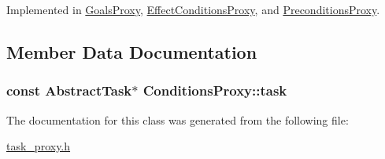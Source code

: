 Implemented in \hyperlink{classGoalsProxy_abfc758e237e5ef8d56fd1e0c0f3eb6f8}{Goals\-Proxy}, \hyperlink{classEffectConditionsProxy_af447849d62079e622be08a68df7dab14}{Effect\-Conditions\-Proxy}, and \hyperlink{classPreconditionsProxy_a63cac56561ada0b576cff8f732a3a902}{Preconditions\-Proxy}.



\subsection{Member Data Documentation}
\hypertarget{classConditionsProxy_a8e8c904bd5dc370a7239ec7495dc0dfe}{
\subsubsection[{task}]{\setlength{\rightskip}{0pt plus 5cm}const {\bf Abstract\-Task}$\ast$ Conditions\-Proxy\-::task\hspace{0.3cm}{\ttfamily [protected]}}}\label{classConditionsProxy_a8e8c904bd5dc370a7239ec7495dc0dfe}


The documentation for this class was generated from the following file\-:\begin{DoxyCompactItemize}
\item 
\hyperlink{task__proxy_8h}{task\-\_\-proxy.\-h}\end{DoxyCompactItemize}
